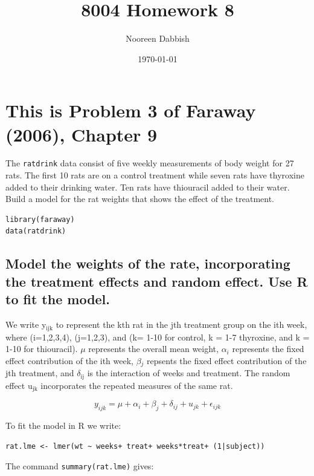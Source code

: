 \documentclass[11pt]{article}
\title{8004 Homework 8}
\author{Nooreen Dabbish}
\date{\today}
\begin{document}
\maketitle




\section{This is Problem 3 of Faraway (2006), Chapter 9}
\label{sec-1}


The \verb~ratdrink~ data consist of five weekly measurements of body
weight for 27 rats. The first 10 rats are on a control treatment
while seven rats have thyroxine added to their drinking water. Ten
rats have thiouracil added to their water. Build a model for the rat
weights that shows the effect of the treatment.


\begin{verbatim}
library(faraway)
data(ratdrink)
\end{verbatim}
\subsection{Model the weights of the rate, incorporating the treatment effects and random effect. Use R to fit the model.}
\label{sec-1-1}


We write y$_{\mathrm{ijk}}$ to represent the kth rat in the jth treatment group
on the ith week, where (i=1,2,3,4), (j=1,2,3), and (k= 1-10 for
control, k = 1-7 thyroxine, and k = 1-10 for thiouracil). $\mu$
represents the overall mean weight, $\alpha$$_i$ represents the fixed
effect contribution of the ith week, $\beta$$_j$ repsents the fixed
effect contribution of the jth treatment, and $\delta$$_{\mathrm{ij}}$ is the
interaction of weeks and treatment. The random effect u$_{\mathrm{jk}}$
incorporates the repeated measures of the same rat.

$$y_{ijk} = \mu + \alpha_i + \beta_j + \delta_{ij} + u_{jk} + \epsilon_{ijk}$$

To fit the model in R we write:

 \verb,rat.lme <- lmer(wt ~ weeks+ treat+ weeks*treat+ (1|subject)),

The command \verb~summary(rat.lme)~ gives:
\end{document}
